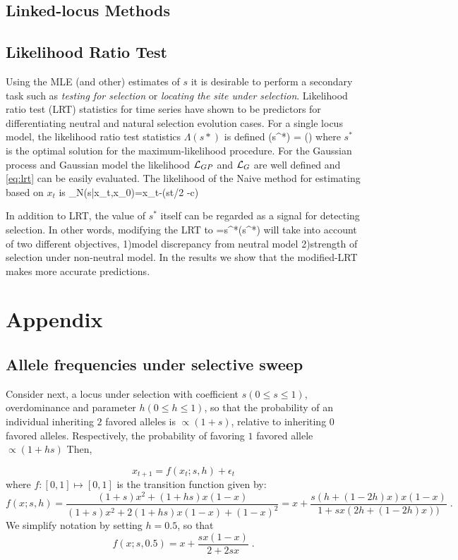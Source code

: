\documentclass[11pt]{article}
\begin{document}
\subsection{Linked-locus Methods}

\subsection{Likelihood Ratio Test}
Using the MLE (and other) estimates of $s$ it is desirable to perform a 
secondary task such as \emph{testing for selection} or \emph{locating the 
site under selection}. Likelihood ratio test (LRT) statistics for time series 
\cite{feder2014identifying} have shown to be predictors for differentiating
 neutral and  natural selection evolution cases. For a single locus model, the
  likelihood ratio 
test statistics $\Lambda(s*)$ is defined
\beq \label{eq:lrt}
\Lambda(s^*) = \log \left(\right)
\eeq
where $s^*$ is the optimal solution for the maximum-likelihood procedure. 
For the Gaussian process and Gaussian model the likelihood ${\cal L}_{GP}$ and 
${\cal L}_G$ are well defined and \eqref{eq:lrt} can be easily evaluated. The 
likelihood of the Naive method for estimating based on $x_t$ is 
\beq
\Lc_N(s|x_t,x_0)=x_t-\sigma(st/2 -c)
\eeq

In addition to LRT, the value of $s^*$ itself can be regarded as a signal for 
detecting selection. In other words, modifying the LRT to
\beq
\Theta=s^*\Lambda(s^*)
\eeq
will take into account of two different objectives, 1)model discrepancy from 
neutral model 2)strength of selection under non-neutral model. In the  results 
we show that the modified-LRT makes more accurate predictions.
\newpage


\newpage
\section{Appendix}
\subsection{Allele frequencies under selective sweep}
Consider next, a locus under selection with coefficient $s (0\le s\le
1)$, overdominance and parameter $h (0\le h\le 1)$, so that the
probability of an individual inheriting $2$ favored alleles is
$\propto (1+s)$, relative to inheriting $0$ favored
alleles. Respectively, the probability of favoring $1$ favored allele
$\propto (1+hs)$ Then,


\begin{equation}
x_{t+1} = f(x_t;s,h) + \epsilon_t
\label{eq:trans0} 
\end{equation}
where $f: [0,1] \mapsto [0,1]$ is the
transition function given by:
\begin{equation}
f(x;s,h)=\frac{(1+s)x^2 + (1+hs)x(1-x)}{(1+s)x^2 + 2(1+hs)x(1-x) + (1-x)^2}
=x+\frac{s(h+(1-2h)x)x(1-x)}{1+sx(2h+(1-2h)x))}\;.
\end{equation}
We simplify notation by setting $h=0.5$, so that
\begin{equation}
f(x;s,0.5)=x+\frac{sx(1-x)}{2+2sx}\;.
\label{eq:hequalshalf}
\end{equation}
\end{document}

